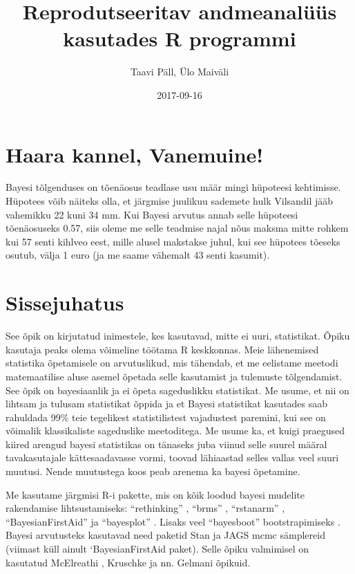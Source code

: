 \documentclass[]{book}
\title{Reprodutseeritav andmeanalüüs kasutades R programmi}
\author{Taavi Päll, Ülo Maiväli}
\date{2017-09-16}
\begin{document}
\maketitle

{
\setcounter{tocdepth}{1}
\tableofcontents
}
\chapter{Haara kannel, Vanemuine!}\label{haara-kannel-vanemuine}

Bayesi tõlgenduses on tõenäosus teadlase usu määr mingi hüpoteesi
kehtimisse. Hüpotees võib näiteks olla, et järgmise juulikuu sademete
hulk Vilsandil jääb vahemikku 22 kuni 34 mm. Kui Bayesi arvutus annab
selle hüpoteesi tõenäosuseks 0.57, siis oleme me selle teadmise najal
nõus maksma mitte rohkem kui 57 senti kihlveo eest, mille alusel
makstakse juhul, kui see hüpotees tõeseks osutub, välja 1 euro (ja me
saame vähemalt 43 senti kasumit).

\chapter{Sissejuhatus}\label{intro}

See õpik on kirjutatud inimestele, kes kasutavad, mitte ei uuri,
statistikat. Õpiku kasutaja peaks olema võimeline töötama R keskkonnas.
Meie lähenemised statistika õpetamisele on arvutuslikud, mis tähendab,
et me eelistame meetodi matemaatilise aluse asemel õpetada selle
kasutamist ja tulemuste tõlgendamist. See õpik on bayesiaanlik ja ei
õpeta sageduslikku statistikat. Me usume, et nii on lihtsam ja tulusam
statistikat õppida ja et Bayesi statistikat kasutades saab rahuldada
99\% teie tegelikest statistilistest vajadustest paremini, kui see on
võimalik klassikaliste sageduslike meetoditega. Me usume ka, et kuigi
praegused kiired arengud bayesi statistikas on tänaseks juba viinud
selle suurel määral tavakasutajale kättesaadavasse vormi, toovad
lähiaastad selles vallas veel suuri muutusi. Nende muutustega koos peab
arenema ka bayesi õpetamine.

Me kasutame järgmisi R-i pakette, mis on kõik loodud bayesi mudelite
rakendamise lihtsustamiseks: ``rethinking'' \citep{rethinking}, ``brms''
\citep{brms}, ``rstanarm'' \citep{rstanarm}, ``BayesianFirstAid''
\citep{bayesianfirstaid} ja ``bayesplot'' \citep{bayesplot}. Lisaks veel
``bayesboot'' bootstrapimiseks \citep{bayesboot}. Bayesi arvutusteks
kasutavad need paketid Stan ja JAGS mcmc sämplereid (viimast küll ainult
`BayesianFirstAid paket). Selle õpiku valmimisel on kasutatud McElreathi
\citep{mcelreath2015}, Kruschke \citep{kruschke2014} ja nn. Gelmani
\citep{gelman2014} õpikuid.
\end{document}
